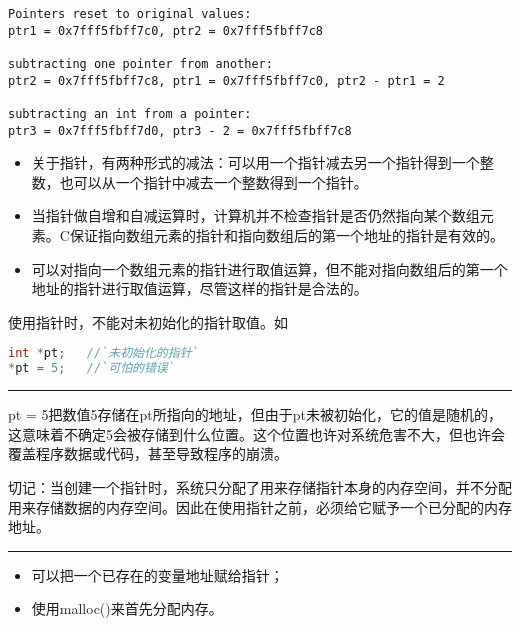 \begin{frame}[fragile]\ft{\secname}
\begin{lstlisting}[backgroundcolor=\color{red!20}]
Pointers reset to original values:
ptr1 = 0x7fff5fbff7c0, ptr2 = 0x7fff5fbff7c8

subtracting one pointer from another:
ptr2 = 0x7fff5fbff7c8, ptr1 = 0x7fff5fbff7c0, ptr2 - ptr1 = 2

subtracting an int from a pointer:
ptr3 = 0x7fff5fbff7d0, ptr3 - 2 = 0x7fff5fbff7c8
\end{lstlisting}
\end{frame}

\begin{frame}[fragile]
\begin{itemize}
\item 关于指针，有两种形式的减法：可以用一个指针减去另一个指针得到一个整数，也可以从一个指针中减去一个整数得到一个指针。\\[0.1in]
\item 当指针做自增和自减运算时，计算机并不检查指针是否仍然指向某个数组元素。\textcolor{acolor1}{C保证指向数组元素的指针和指向数组后的第一个地址的指针是有效的。}\\[0.1in]
\item 可以对指向一个数组元素的指针进行取值运算，但不能对指向数组后的第一个地址的指针进行取值运算，尽管这样的指针是合法的。
\end{itemize}
\end{frame}

\begin{frame}[fragile]
使用指针时，不能对未初始化的指针取值。如
\begin{lstlisting}[language=c,backgroundcolor=\color{red!20}]
int *pt;   //`未初始化的指针`
*pt = 5;   //`可怕的错误`
\end{lstlisting}
\rule{\textwidth}{0.3mm} \vspace{0.05in}\pause 

{\tf *pt = 5}把数值5存储在{\tf pt}所指向的地址，但由于{\tf pt}未被初始化，它的值是随机的，这意味着不确定5会被存储到什么位置。这个位置也许对系统危害不大，但也许会覆盖程序数据或代码，甚至导致程序的崩溃。
\end{frame}

\begin{frame}[fragile]
切记：当创建一个指针时，系统只分配了用来存储指针本身的内存空间，并不分配用来存储数据的内存空间。因此在使用指针之前，必须给它赋予一个已分配的内存地址。

\rule{\textwidth}{0.3mm} \pause 

\begin{itemize}
\item 可以把一个已存在的变量地址赋给指针；
\item 使用{\tf malloc()}来首先分配内存。
\end{itemize}
\end{frame}

